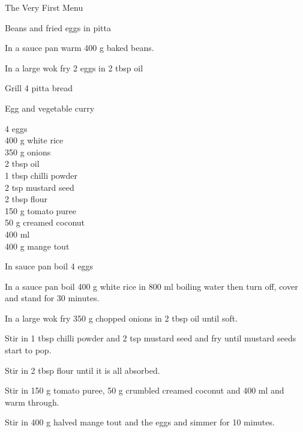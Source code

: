 \begin{menu}{The Very First Menu}
\begin{recipe}{1}{Beans and fried eggs in pitta}
    \begin{instructions}
    \item 
        In a sauce pan warm
        400 g  baked beans.
      \item 
        In a large wok fry
        2   eggs
        in
        2 tbsp  oil\item 
        Grill
        4   pitta bread
    \end{instructions}
    \end{recipe}%
  
    \begin{recipe}{2}{Egg and vegetable curry}%
    
	
		\begin{ingredients}
		4  eggs  \\
	400 g white rice  \\
	350 g onions  \\
	2 tbsp oil  \\
	1 tbsp chilli powder  \\
	2 tsp mustard seed  \\
	2 tbsp flour  \\
	150 g tomato puree  \\
	50 g creamed coconut  \\
	400 ml   \\
	400 g mange tout  \\
	
		\end{ingredients}
	
    \begin{instructions}
    \item 
        In sauce pan boil
        4   eggs\item 
      In a
      sauce pan
      boil
      400 g  white rice
      in
      800 ml  boiling water
      then turn off, cover and stand for 30 minutes.
    \item 
        In a large wok fry
        350 g chopped onions
        in
        2 tbsp  oil
        until soft.
      \item 
        Stir in 1 tbsp  chilli powder
        and
        2 tsp  mustard seed
        and fry until mustard seeds start to pop.
      \item 
        Stir in
        2 tbsp  flour
        until it is all absorbed.
      \item 
        Stir in
        150 g  tomato puree,
        50 g crumbled creamed coconut
        and
        400 ml  
        and warm through.
      \item 
        Stir in
        400 g halved mange tout
        and the eggs
        and simmer for 10 minutes.
      

\end{instructions}
\end{recipe}
\end{menu}
